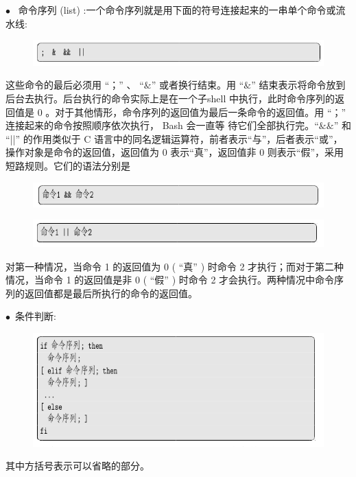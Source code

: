 \documentclass[12pt，a4paper]{article}
\numberwithin{equation}{section}
\begin{document}
$\bullet$~ 命令序列 (list) :一个命令序列就是用下面的符号连接起来的一串单个命令或流水线:
\begin{figure}[H]
\centering
\includegraphics[scale=0.6]{./figures/249.png}
\end{figure}
这些命令的最后必须用 “；” 、 “$\&$” 或者换行结束。用 “$\&$” 结束表示将命令放到后台去执行。后台执行的命令实际上是在一个子shell 中执行，此时命令序列的返回值是 0 。对于其他情形，命令序列的返回值为最后一条命令的返回值。用 “；” 连接起来的命令按照顺序依次执行， Bash 会一直等
待它们全部执行完。“$\&\&$” 和 “||” 的作用类似于 C 语言中的同名逻辑运算符，前者表示“与”，后者表示“或”，操作对象是命令的返回值，返回值为 0 表示“真”，返回值非 0 则表示“假”，采用短路规则。它们的语法分别是
\begin{figure}[H]
\centering
\includegraphics[scale=0.6]{./figures/250.png}
\end{figure}
\begin{figure}[H]
\centering
\includegraphics[scale=0.6]{./figures/251.png}
\end{figure}
对第一种情况，当命令 1 的返回值为 0 ( “真” ) 时命令 2 才执行；而对于第二种情况，当命令 1 的返回值是非 0 ( “假” ) 时命令 2
才会执行。两种情况中命令序列的返回值都是最后所执行的命令的返回值。

$\bullet$~条件判断:

\begin{figure}[H]
\centering
\includegraphics[scale=0.6]{./figures/278.png}
\end{figure}
其中方括号表示可以省略的部分。
\end{document}

